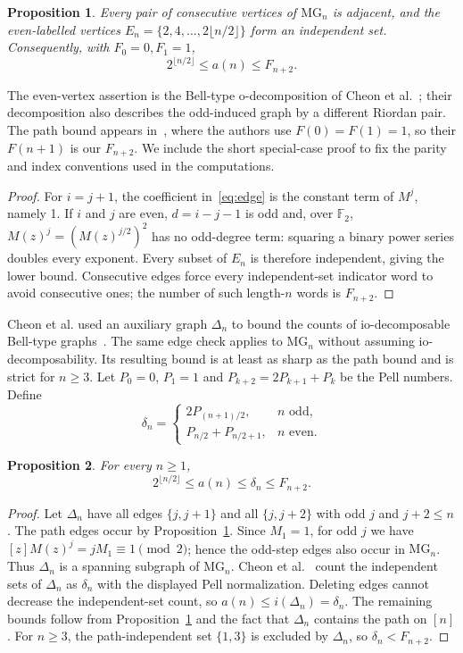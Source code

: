 \documentclass[11pt,a4paper]{article}
\newtheorem{proposition}{Proposition}[section]
\newcommand{\MG}{\mathrm{MG}}
\begin{document}
\begin{proposition}\label{prop:parity}
Every pair of consecutive vertices of $\MG_n$ is adjacent, and the
even-labelled vertices $E_n=\{2,4,\ldots,2\lfloor n/2\rfloor\}$ form an
independent set.  Consequently, with $F_0=0,F_1=1$,
\begin{equation}\label{eq:bounds}
 2^{\lfloor n/2\rfloor}\leq a(n)\leq F_{n+2}.
\end{equation}
\end{proposition}
The even-vertex assertion is the Bell-type o-decomposition of
Cheon et al.~\cite[Theorem~4.3]{structure}; their decomposition also
describes the odd-induced graph by a different Riordan pair.  The path
bound appears in~\cite[Theorem~3.2 and Corollary~3.3]{counting}, where
the authors use $F(0)=F(1)=1$, so their $F(n+1)$ is our $F_{n+2}$.
We include the short special-case proof to fix the parity and index
conventions used in the computations.
\begin{proof}
For $i=j+1$, the coefficient in~\eqref{eq:edge} is the constant term
of $M^j$, namely 1.  If $i$ and $j$ are even, $d=i-j-1$ is odd and,
over $\mathbb F_2$, $M(z)^j=(M(z)^{j/2})^2$ has no odd-degree term:
squaring a binary power series doubles every exponent.
Every subset of $E_n$ is therefore independent, giving the lower bound.
Consecutive edges force every independent-set indicator word to avoid
consecutive ones; the number of such length-$n$ words is $F_{n+2}$.
\end{proof}

Cheon et al. used an auxiliary graph $\Delta_n$ to bound the counts of
io-decomposable Bell-type graphs~\cite{counting}.  The same edge check
applies to $\MG_n$ without assuming io-decomposability.  Its resulting
bound is at least as sharp as the path bound and is strict for $n\geq3$.
Let $P_0=0$, $P_1=1$ and
$P_{k+2}=2P_{k+1}+P_k$ be the Pell numbers.  Define
\[
 \delta_n=
 \begin{cases}
  2P_{(n+1)/2},&n\text{ odd},\\
  P_{n/2}+P_{n/2+1},&n\text{ even}.
 \end{cases}
\]
\begin{proposition}\label{prop:pell}
For every $n\geq1$,
\[
 2^{\lfloor n/2\rfloor}\leq a(n)\leq\delta_n\leq F_{n+2}.
\]
\end{proposition}
\begin{proof}
Let $\Delta_n$ have all edges $\{j,j+1\}$ and all
$\{j,j+2\}$ with odd $j$ and $j+2\leq n$.  The path edges occur by
Proposition~\ref{prop:parity}.  Since $M_1=1$, for odd $j$ we have
$[z]M(z)^j=jM_1\equiv1\pmod{2}$; hence the odd-step edges also occur
in $\MG_n$.  Thus $\Delta_n$ is a spanning subgraph of $\MG_n$.
Cheon et al.~\cite[Lemma~3.4]{counting} count the independent sets of
$\Delta_n$ as $\delta_n$ with the displayed Pell normalization.
Deleting edges cannot decrease the independent-set count, so
$a(n)\leq i(\Delta_n)=\delta_n$.  The remaining bounds follow from
Proposition~\ref{prop:parity} and the fact that $\Delta_n$ contains
the path on $[n]$.  For $n\geq3$, the path-independent set
$\{1,3\}$ is excluded by $\Delta_n$, so $\delta_n<F_{n+2}$.
\end{proof}
\end{document}
